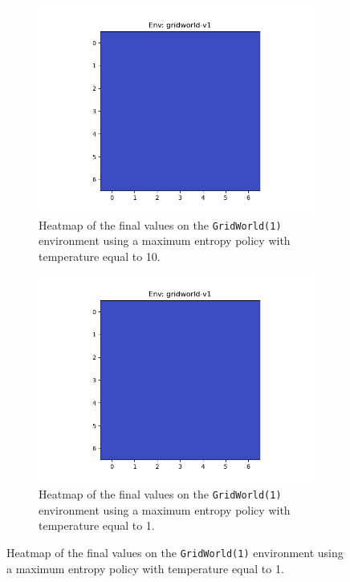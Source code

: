 \documentclass{article}
\begin{document}
\begin{enumerate}[(a)]
\begin{figure}[h!]
    \centering
    \begin{subfigure}{0.3\textwidth}
        \centering
        \includegraphics[width=\textwidth]{../figures/gridworld-v1_maxent_t0.png}
        \caption{Heatmap of the final values on the \texttt{GridWorld(1)} environment using a maximum entropy policy with temperature equal to 10.}
    \end{subfigure}
    \hspace{0.1 in}
    \begin{subfigure}{0.3\textwidth}
        \centering
        \includegraphics[width=\textwidth]{../figures/gridworld-v1_maxent_t1.png}
        \caption{Heatmap of the final values on the \texttt{GridWorld(1)} environment using a maximum entropy policy with temperature equal to 1.}

\end{subfigure}
\end{figure}
\end{enumerate}
\end{document}
